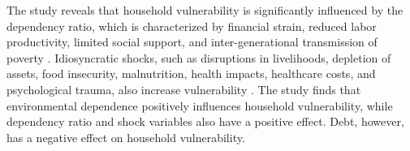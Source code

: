 The study reveals that household vulnerability is significantly influenced by the dependency ratio, which is characterized by financial strain, reduced labor productivity, limited social support, and inter-generational transmission of poverty \citep{rabbani2021role, sun2020nexus}. Idiosyncratic shocks, such as disruptions in livelihoods, depletion of assets, food insecurity, malnutrition, health impacts, healthcare costs, and psychological trauma, also increase vulnerability \cite{buhler2018shocks, barua2020impact, volker2010rural}. The study finds that environmental dependence positively influences household vulnerability, while dependency ratio and shock variables also have a positive effect. Debt, however, has a negative effect on household vulnerability.
